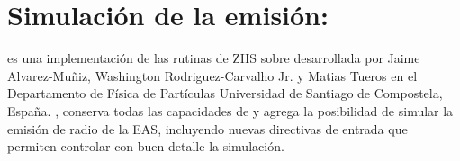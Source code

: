 \section{Simulaci\'on de la emisi\'on: \zhs{}}
\label{sc:simRadio}
% 	
% 	

	\zhs{} es una implementaci\'on de las rutinas de ZHS \cite{2_zas_halzen_stanev_1992} sobre \aires{} desarrollada por Jaime Alvarez-Muñiz, Washington Rodriguez-Carvalho Jr. y Matias Tueros en el Departamento de Física de Partículas Universidad de Santiago de Compostela, España.
	\zhs{}, conserva todas las capacidades de \aires{} y agrega la posibilidad de simular la emisi\'on de radio de la EAS, incluyendo nuevas directivas de entrada que permiten controlar con buen detalle la simulación.
	
